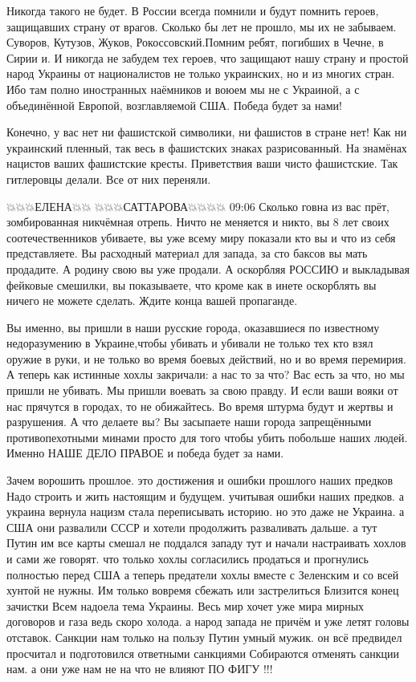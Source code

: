 
Никогда такого не будет. В России всегда помнили и будут помнить героев,
защищавших страну от врагов. Сколько бы лет не прошло, мы их не забываем.
Суворов, Кутузов, Жуков, Рокоссовский.Помним ребят, погибших в Чечне, в Сирии
и. И никогда не забудем тех героев, что защищают нашу страну и простой народ
Украины от националистов не только украинских, но и из многих стран. Ибо там
полно иностранных наёмников и воюем мы не с Украиной, а с объединённой Европой,
возглавляемой США. Победа будет за нами!


Конечно, у вас нет ни фашистской символики, ни фашистов в стране нет! Как ни
украинский пленный, так весь в фашистских знаках разрисованный. На знамёнах
нацистов ваших фашистские кресты. Приветствия ваши чисто фашистские. Так
гитлеровцы делали. Все от них переняли.

💥💥💥ЕЛЕНА💥💥 💥💥💥САТТАРОВА💥💥💥💥
09:06
Сколько говна из вас прёт, зомбированная никчёмная отрепь.
Ничто не меняется и никто, вы 8 лет своих соотечественников убиваете, вы уже всему миру показали кто вы и что из себя представляете. Вы расходный материал для запада, за сто баксов вы мать продадите. А родину свою вы уже продали. А оскорбляя РОССИЮ и выкладывая фейковые смешилки, вы показываете, что кроме как в инете оскорблять вы ничего не можете сделать.
Ждите конца вашей пропаганде.


Вы именно, вы пришли в наши русские города, оказавшиеся по известному
недоразумению в Украине,чтобы убивать и убивали не только тех кто взял оружие в
руки, и не только во время боевых действий, но и во время перемирия. А теперь
как истинные хохлы закричали: а нас то за что? Вас есть за что, но мы пришли не
убивать. Мы пришли воевать за свою правду. И если ваши вояки от нас прячутся в
городах, то не обижайтесь. Во время штурма будут и жертвы и разрушения. А что
делаете вы? Вы засыпаете наши города запрещёнными противопехотными минами
просто для того чтобы убить побольше наших людей. Именно НАШЕ ДЕЛО ПРАВОЕ и
победа будет за нами.



Зачем ворошить прошлое. это достижения и ошибки прошлого наших предков Надо
строить и жить настоящим и будущем. учитывая ошибки наших предков. а украина
вернула нацизм стала переписывать историю. но это даже не Украина. а США они
развалили СССР и хотели продолжить разваливать дальше. а тут Путин им все карты
смешал не поддался западу тут и начали настраивать хохлов и сами же говорят.
что только хохлы согласились продаться и прогнулись полностью перед США а
теперь предатели хохлы вместе с Зеленским и со всей хунтой не нужны. Им только
вовремя сбежать или застрелиться Близится конец зачистки Всем надоела тема
Украины. Весь мир хочет уже мира мирных договоров и газа ведь скоро холода. а
народ запада не причём и уже летят головы отставок. Санкции нам только на
пользу Путин умный мужик. он всё предвидел просчитал и подготовился ответными
санкциями Собираются отменять санкции нам. а они уже нам не на что не влияют ПО
ФИГУ !!!

